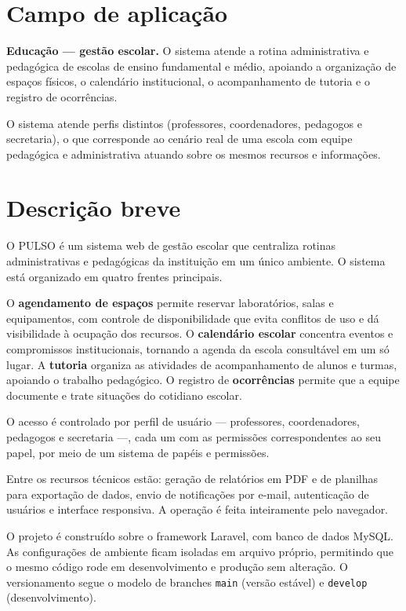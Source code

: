 \documentclass[12pt,a4paper]{article}
\begin{document}
\section{Campo de aplicação}
\textbf{Educação --- gestão escolar.} O sistema atende a rotina administrativa e pedagógica de escolas de ensino fundamental e médio, apoiando a organização de espaços físicos, o calendário institucional, o acompanhamento de tutoria e o registro de ocorrências.

O sistema atende perfis distintos (professores, coordenadores, pedagogos e secretaria), o que corresponde ao cenário real de uma escola com equipe pedagógica e administrativa atuando sobre os mesmos recursos e informações.

\section{Descrição breve}
O PULSO é um sistema web de gestão escolar que centraliza rotinas administrativas e pedagógicas da instituição em um único ambiente. O sistema está organizado em quatro frentes principais.

O \textbf{agendamento de espaços} permite reservar laboratórios, salas e equipamentos, com controle de disponibilidade que evita conflitos de uso e dá visibilidade à ocupação dos recursos. O \textbf{calendário escolar} concentra eventos e compromissos institucionais, tornando a agenda da escola consultável em um só lugar. A \textbf{tutoria} organiza as atividades de acompanhamento de alunos e turmas, apoiando o trabalho pedagógico. O registro de \textbf{ocorrências} permite que a equipe documente e trate situações do cotidiano escolar.

O acesso é controlado por perfil de usuário --- professores, coordenadores, pedagogos e secretaria ---, cada um com as permissões correspondentes ao seu papel, por meio de um sistema de papéis e permissões.

Entre os recursos técnicos estão: geração de relatórios em PDF e de planilhas para exportação de dados, envio de notificações por e-mail, autenticação de usuários e interface responsiva. A operação é feita inteiramente pelo navegador.

O projeto é construído sobre o framework Laravel, com banco de dados MySQL. As configurações de ambiente ficam isoladas em arquivo próprio, permitindo que o mesmo código rode em desenvolvimento e produção sem alteração. O versionamento segue o modelo de branches \texttt{main} (versão estável) e \texttt{develop} (desenvolvimento).
\end{document}
